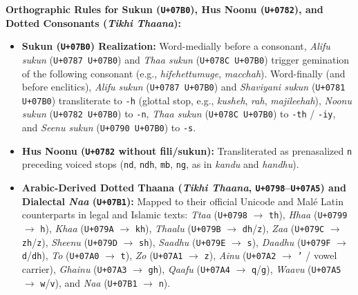 \documentclass[acmsmall,review,anonymous]{acmart}
\begin{document}
\vspace{4pt}
\noindent\textbf{Orthographic Rules for Sukun (\texttt{U+07B0}), Hus Noonu (\texttt{U+0782}), and Dotted Consonants (\textit{Tikhi Thaana}):}
\begin{itemize}
    \item \textbf{Sukun (\texttt{U+07B0}) Realization:} Word-medially before a consonant, \textit{Alifu sukun} (\texttt{U+0787 U+07B0}) and \textit{Thaa sukun} (\texttt{U+078C U+07B0}) trigger gemination of the following consonant (e.g., \textit{hifehettumuge}, \textit{macchah}). Word-finally (and before enclitics), \textit{Alifu sukun} (\texttt{U+0787 U+07B0}) and \textit{Shaviyani sukun} (\texttt{U+0781 U+07B0}) transliterate to \texttt{-h} (glottal stop, e.g., \textit{kusheh}, \textit{rah}, \textit{majileehah}), \textit{Noonu sukun} (\texttt{U+0782 U+07B0}) to \texttt{-n}, \textit{Thaa sukun} (\texttt{U+078C U+07B0}) to \texttt{-th} / \texttt{-iy}, and \textit{Seenu sukun} (\texttt{U+0790 U+07B0}) to \texttt{-s}.
    \item \textbf{Hus Noonu (\texttt{U+0782} without fili/sukun):} Transliterated as prenasalized \texttt{n} preceding voiced stops (\texttt{nd}, \texttt{ndh}, \texttt{mb}, \texttt{ng}, as in \textit{kandu} and \textit{handhu}).
    \item \textbf{Arabic-Derived Dotted Thaana (\textit{Tikhi Thaana}, \texttt{U+0798}--\texttt{U+07A5}) and Dialectal \textit{Naa} (\texttt{U+07B1}):} Mapped to their official Unicode and Mal\'{e} Latin counterparts in legal and Islamic texts: \textit{Ttaa} (\texttt{U+0798} $\rightarrow$ \texttt{th}), \textit{Hhaa} (\texttt{U+0799} $\rightarrow$ \texttt{h}), \textit{Khaa} (\texttt{U+079A} $\rightarrow$ \texttt{kh}), \textit{Thaalu} (\texttt{U+079B} $\rightarrow$ \texttt{dh}/\texttt{z}), \textit{Zaa} (\texttt{U+079C} $\rightarrow$ \texttt{zh}/\texttt{z}), \textit{Sheenu} (\texttt{U+079D} $\rightarrow$ \texttt{sh}), \textit{Saadhu} (\texttt{U+079E} $\rightarrow$ \texttt{s}), \textit{Daadhu} (\texttt{U+079F} $\rightarrow$ \texttt{d}/\texttt{dh}), \textit{To} (\texttt{U+07A0} $\rightarrow$ \texttt{t}), \textit{Zo} (\texttt{U+07A1} $\rightarrow$ \texttt{z}), \textit{Ainu} (\texttt{U+07A2} $\rightarrow$ \texttt{'} / vowel carrier), \textit{Ghainu} (\texttt{U+07A3} $\rightarrow$ \texttt{gh}), \textit{Qaafu} (\texttt{U+07A4} $\rightarrow$ \texttt{q}/\texttt{g}), \textit{Waavu} (\texttt{U+07A5} $\rightarrow$ \texttt{w}/\texttt{v}), and \textit{Naa} (\texttt{U+07B1} $\rightarrow$ \texttt{n}).
\end{itemize}
\end{document}
